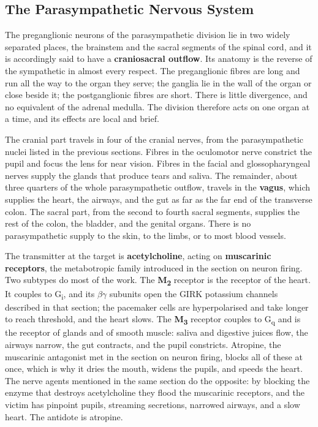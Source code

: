 \documentclass[11pt]{article}
\begin{document}
\subsection{The Parasympathetic Nervous System}

The preganglionic neurons of the parasympathetic division lie in two widely separated places, the brainstem and the sacral segments of the spinal cord, and it is accordingly said to have a \textbf{craniosacral outflow}. Its anatomy is the reverse of the sympathetic in almost every respect. The preganglionic fibres are long and run all the way to the organ they serve; the ganglia lie in the wall of the organ or close beside it; the postganglionic fibres are short. There is little divergence, and no equivalent of the adrenal medulla. The division therefore acts on one organ at a time, and its effects are local and brief.

The cranial part travels in four of the cranial nerves, from the parasympathetic nuclei listed in the previous sections. Fibres in the oculomotor nerve constrict the pupil and focus the lens for near vision. Fibres in the facial and glossopharyngeal nerves supply the glands that produce tears and saliva. The remainder, about three quarters of the whole parasympathetic outflow, travels in the \textbf{vagus}, which supplies the heart, the airways, and the gut as far as the far end of the transverse colon. The sacral part, from the second to fourth sacral segments, supplies the rest of the colon, the bladder, and the genital organs. There is no parasympathetic supply to the skin, to the limbs, or to most blood vessels.

The transmitter at the target is \textbf{acetylcholine}, acting on \textbf{muscarinic receptors}, the metabotropic family introduced in the section on neuron firing. Two subtypes do most of the work. The \textbf{M\textsubscript{2}} receptor is the receptor of the heart. It couples to G\textsubscript{i}, and its $\beta\gamma$ subunits open the GIRK potassium channels described in that section; the pacemaker cells are hyperpolarised and take longer to reach threshold, and the heart slows. The \textbf{M\textsubscript{3}} receptor couples to G\textsubscript{q} and is the receptor of glands and of smooth muscle: saliva and digestive juices flow, the airways narrow, the gut contracts, and the pupil constricts. Atropine, the muscarinic antagonist met in the section on neuron firing, blocks all of these at once, which is why it dries the mouth, widens the pupils, and speeds the heart. The nerve agents mentioned in the same section do the opposite: by blocking the enzyme that destroys acetylcholine they flood the muscarinic receptors, and the victim has pinpoint pupils, streaming secretions, narrowed airways, and a slow heart. The antidote is atropine.
\end{document}
